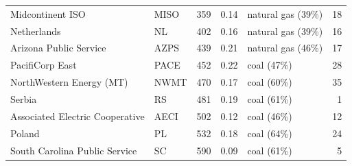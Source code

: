 {\begin{longtable}{@{}llrrlr@{}}
Midcontinent ISO & MISO & 359 & 0.14 & natural gas (39\%) & 18 \\
Netherlands & NL & 402 & 0.16 & natural gas (39\%) & 16 \\
Arizona Public Service & AZPS & 439 & 0.21 & natural gas (46\%) & 17 \\
PacifiCorp East & PACE & 452 & 0.22 & coal (47\%) & 28 \\
NorthWestern Energy (MT) & NWMT & 470 & 0.17 & coal (60\%) & 35 \\
Serbia & RS & 481 & 0.19 & coal (61\%) & 1 \\
Associated Electric Cooperative & AECI & 502 & 0.12 & coal (46\%) & 12 \\
Poland & PL & 532 & 0.18 & coal (64\%) & 24 \\
South Carolina Public Service & SC & 590 & 0.09 & coal (61\%) & 5 \\
\end{longtable}
}
